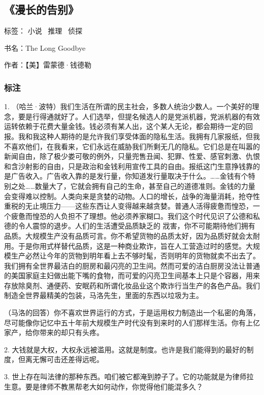 \subsection{《漫长的告别》}

标签： 小说 \ 推理 \  侦探

书名：The Long Goodbye

作者：【美】雷蒙德·钱德勒

\subsubsection{标注}

1. （哈兰·波特）我们生活在所谓的民主社会，多数人统治少数人。一个美好的理念，要是行得通就好了。人们选举，但提名候选人的是党派机器，党派机器的有效运转依赖于花费大量金钱。钱必须有某人出，这个某人无论，都会期待一定的回报。我和我这种人期待的是允许我们享受体面的隐私生活。我拥有几家报纸，但我不喜欢他们，在我看来，它们永远在威胁我们所剩无几的隐私。它们总是在叫嚣的新闻自由，除了极少娄可敬的例外，只量兜售丑闻、犯罪、性爱、感官刺激、仇恨和含沙射影的自由，只是政治和金钱利用宣传工具的自由。报纸这门生意挣钱靠的是广告收入。广告收入靠的是发行量，你知道发行量取决于什么。……金钱有个特别之处……数量大了，它就会拥有自己的生命，甚至自己的道德准则。金钱的力量会变得难以控制。人类向来是贪婪的动物。人口的增长，战争的海量消耗，抢夺性重税的无止境压力——这些东西让人变得越来越贪婪。普通人活得疲惫而惶恐，一个疲惫而惶恐的人负担不了理想。他必须养家糊口。我们这个时代见识了公德和私德的令人震惊的退步。人们的生活遭受品质缺乏的	戕害，你不可能期待他们拥有品质。大规模生产没有品质可言。你不希望货物的品质太好，因为品质好就会太耐用。于是你用式样替代品质，这是一种商业欺诈，旨在人工营造过时的感觉。大规模生产必然让今年的货物到明年看上去不够时髦，否则明年的货物就卖不出去了。我们拥有全世界最洁白的厨房和最闪亮的卫生间。然而可爱的洁白厨房没法让普通的美国家庭主妇做出能下嘴的食物，而可爱的闪亮卫生间基本上只是个容器，用来存放除臭剂、通便药、安眠药和所谓化妆品业这个欺诈行当生产的各色产品。我们制造全世界最精美的包装，马洛先生，里面的东西以垃圾为主。

（马洛的回答）你不喜欢世界运行的方式，于是运用权力制造出一个私密的角落，尽可能像你记忆中五十年前大规模生产时代没有到来时的人们那样生活。你有上亿家产，给你带来的却只有头疼。

2. 大钱就是大权，大权永远被滥用。这就是制度。也许是我们能得到的最好的制度，但离无懈可击还差得远呢。

3. 世上存在叫法律的那种东西。咱们被它都淹到脖子了。它的功能就是为律师拉生意。要是律师不教黑帮老大如何动作，你觉得他们能混多久？

